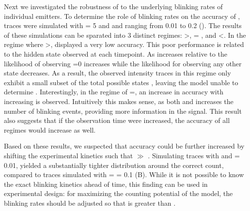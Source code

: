 Next we investigated the robustness of \ours to the underlying blinking rates of individual emitters. 
To determine the role of blinking rates on the accuracy of \ours, traces were simulated with \truen = 5 and \pon and \poff ranging from 0.01 to 0.2 (). 
The results of these simulations can be sparated into 3 distinct regimes: \poff \textgreater \pon, \poff = \pon, and \poff \textless \pon. 
In the regime where \poff \textgreater \pon, \ours displayed a very low accuracy. This poor performance is related to the hidden state  observed at each timepoint. 
%
As \poff increases relative to \pon the likelihood of observing =0 increases while the likelihood for observing any other state decreases. As a result, the observed intensity traces in this regime only exhibit a small subset of the total possible states \y{}, leaving the model unable to determine \truen. 
Interestingly, in the regime of \poff=\pon, an increase in \ours accuracy with increasing \pon is observed. Intuitively this makes sense, as both \pon and \poff increases the number of blinking events, providing more information in the signal. This result also suggests that if the observation time were increased, the accuracy of all regimes would increase as well. 

Based on these results, we suspected that accuracy could be further
increased by shifting the experimental kinetics such that \pon $\gg$ \poff. Simulating
traces with  and \poff= 0.01, yielded a substantially tighter distribution
around the correct count, compared to traces simulated with \pon =
\poff = 0.1 (B). While it is not possible to know the exact blinking
kinetics ahead of time, this finding can be used in experimental design: for maximizing the counting potential of the model, the blinking rates should be adjusted so that \pon is greater than \poff.